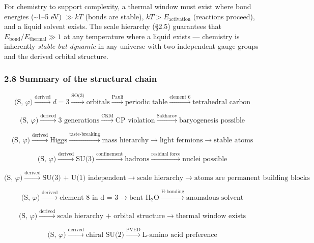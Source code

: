 \documentclass[
]{article}
\begin{document}
For chemistry to support complexity, a thermal window must exist where
bond energies (\textasciitilde1--5 eV) \(\gg kT\) (bonds are stable),
\(kT > E_{\text{activation}}\) (reactions proceed), and a liquid solvent
exists. The scale hierarchy (§2.5) guarantees that
\(E_{\text{bond}} / E_{\text{thermal}} \gg 1\) at any temperature where
a liquid exists --- chemistry is inherently \emph{stable but dynamic} in
any universe with two independent gauge groups and the derived orbital
structure.

\hypertarget{summary-of-the-structural-chain}{%
\subsubsection{2.8 Summary of the structural
chain}\label{summary-of-the-structural-chain}}

\[\text{(S, } \varphi\text{)} \xrightarrow{\text{derived}} d = 3 \xrightarrow{\text{SO(3)}} \text{orbitals} \xrightarrow{\text{Pauli}} \text{periodic table} \xrightarrow{\text{element 6}} \text{tetrahedral carbon}\]

\[\text{(S, } \varphi\text{)} \xrightarrow{\text{derived}} \text{3 generations} \xrightarrow{\text{CKM}} \text{CP violation} \xrightarrow{\text{Sakharov}} \text{baryogenesis possible}\]

\[\text{(S, } \varphi\text{)} \xrightarrow{\text{derived}} \text{Higgs} \xrightarrow{\text{taste-breaking}} \text{mass hierarchy} \xrightarrow{} \text{light fermions} \xrightarrow{} \text{stable atoms}\]

\[\text{(S, } \varphi\text{)} \xrightarrow{\text{derived}} \text{SU(3)} \xrightarrow{\text{confinement}} \text{hadrons} \xrightarrow{\text{residual force}} \text{nuclei possible}\]

\[\text{(S, } \varphi\text{)} \xrightarrow{\text{derived}} \text{SU(3) + U(1) independent} \xrightarrow{} \text{scale hierarchy} \xrightarrow{} \text{atoms are permanent building blocks}\]

\[\text{(S, } \varphi\text{)} \xrightarrow{\text{derived}} \text{element 8 in d = 3} \xrightarrow{} \text{bent H}_2\text{O} \xrightarrow{\text{H-bonding}} \text{anomalous solvent}\]

\[\text{(S, } \varphi\text{)} \xrightarrow{\text{derived}} \text{scale hierarchy + orbital structure} \xrightarrow{} \text{thermal window exists}\]

\[\text{(S, } \varphi\text{)} \xrightarrow{\text{derived}} \text{chiral SU(2)} \xrightarrow{\text{PVED}} \text{L-amino acid preference}\]
\end{document}

